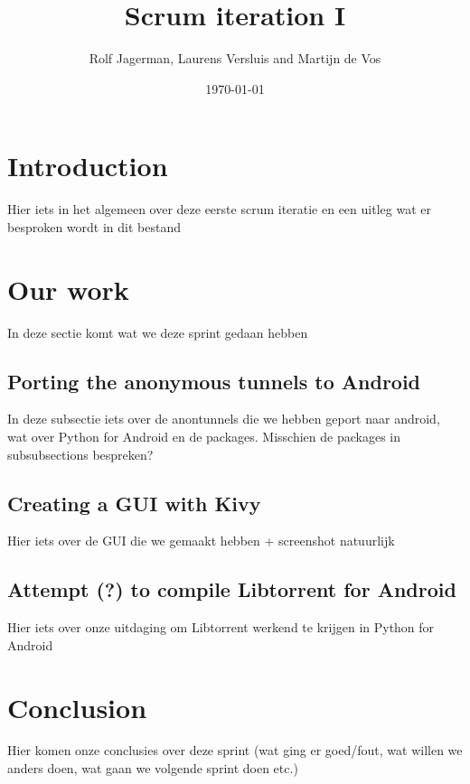 \documentclass{article}
\title{Scrum iteration I}
\author{Rolf Jagerman, Laurens Versluis and Martijn de Vos}
\date{\today}
\begin{document}
\maketitle

\newpage

\section{Introduction}
Hier iets in het algemeen over deze eerste scrum iteratie en een uitleg wat er besproken wordt in dit bestand

\section{Our work}
In deze sectie komt wat we deze sprint gedaan hebben

\subsection{Porting the anonymous tunnels to Android}
In deze subsectie iets over de anontunnels die we hebben geport naar android, wat over Python for Android en de packages. Misschien de packages in subsubsections bespreken?

\subsection{Creating a GUI with Kivy}
Hier iets over de GUI die we gemaakt hebben + screenshot natuurlijk

\subsection{Attempt (?) to compile Libtorrent for Android}
Hier iets over onze uitdaging om Libtorrent werkend te krijgen in Python for Android

\section{Conclusion}
Hier komen onze conclusies over deze sprint (wat ging er goed/fout, wat willen we anders doen, wat gaan we volgende sprint doen etc.)
\end{document}
